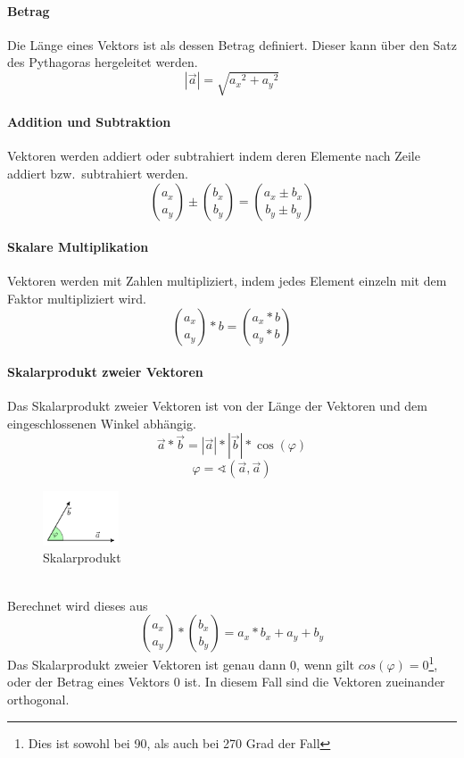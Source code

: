 \documentclass{school}
\begin{document}
\paragraph{Betrag}
Die Länge eines Vektors ist als dessen Betrag definiert. Dieser kann über den Satz des Pythagoras hergeleitet werden.
$$|\vec{a}| = \sqrt{{a_x}^2 + {a_y}^2}$$

\paragraph{Addition und Subtraktion}
Vektoren werden addiert oder subtrahiert indem deren Elemente nach Zeile addiert bzw.\ subtrahiert werden.
$$\binom{a_x}{a_y} \pm \binom{b_x}{b_y} = \binom{a_x \pm b_x}{b_y \pm b_y}$$

\paragraph{Skalare Multiplikation}
Vektoren werden mit Zahlen multipliziert, indem jedes Element einzeln mit dem Faktor multipliziert wird.
$$\binom{a_x}{a_y} * b = \binom{a_x * b}{a_y * b}$$

\paragraph{Skalarprodukt zweier Vektoren}
Das Skalarprodukt zweier Vektoren ist von der Länge der Vektoren und dem eingeschlossenen Winkel abhängig.
$$\vec{a} * \vec{b} = |\vec{a}| * |\vec{b}| * \cos(\varphi)$$
$$\varphi = \sphericalangle(\vec{a}, \vec{a})$$
\begin{figure}[hh]
    \centering
    \includegraphics[width=0.2\textwidth]{skalar.png}
    \caption[https://de.wikipedia.org/wiki/Skalarprodukt\#/media/File:Dot-product-3.3.svg]{Skalarprodukt}
    \label{fig:skalar}
\end{figure}~\\
Berechnet wird dieses aus
$$\binom{a_x}{a_y} * \binom{b_x}{b_y} = a_x * b_x + a_y + b_y$$
Das Skalarprodukt zweier Vektoren ist genau dann 0, wenn gilt $cos(\varphi) = 0$\footnote{Dies ist sowohl bei 90, als auch bei 270 Grad der Fall}, oder der Betrag eines Vektors 0 ist. In diesem Fall sind die Vektoren zueinander orthogonal.

\newpage
\end{document}
